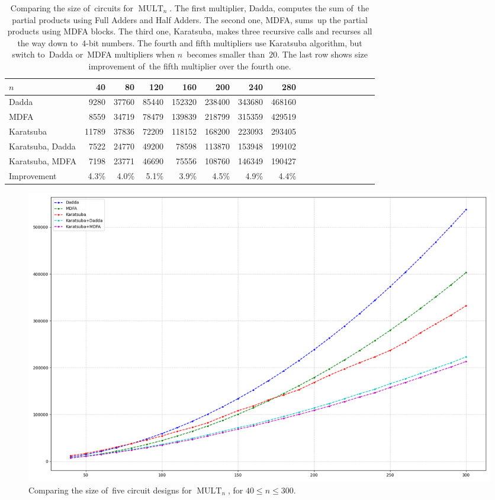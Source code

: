 \documentclass[a4paper, UKenglish, cleveref, autoref,  thm-restate, anonymous]{lipics-v2021}
\DeclareMathOperator{\MULT}{MULT}
\begin{document}
    \begin{table}[ht]
                \caption{Comparing the size of~circuits for $\MULT_n$. The first multiplier, Dadda, computes the sum of~the partial products using Full Adders and Half Adders. The second one, MDFA, sums~up the partial products using MDFA blocks.
            The third one, Karatsuba, makes three recursive calls and recurses all the way down to~4-bit numbers. The fourth and fifth multipliers use Karatsuba algorithm, but switch to~Dadda or~MDFA multipliers when $n$~becomes smaller than~$20$. The last row shows size improvement of~the fifth multiplier over the fourth one.}
        \label{table:multiplication}
        \begin{center}
            \small
            \begin{tabular}{lrrrrrrrrrrrrrrrr}
                \toprule
                $n$ & 40 & 80 & 120 & 160 & 200 & 240 & 280 \\
                \midrule
                Dadda & 9280 & 37760 & 85440 & 152320 & 238400 & 343680 & 468160 \\
                MDFA & 8559 & 34719 & 78479 & 139839 & 218799 & 315359 & 429519 \\
                Karatsuba & 11789 & 37836 & 72209 & 118152 & 168200 & 223093 & 293405 \\
                Karatsuba, Dadda& 7522 & 24770 & 49200 & 78598 & 113870 & 153948 & 199102 \\
                Karatsuba, MDFA& 7198 & 23771 & 46690 & 75556 & 108760 & 146349 & 190427 \\
                Improvement  & 4.3\%  & 4.0\%  & 5.1\%  & 3.9\%  & 4.5\%  & 4.9\%  & 4.4\% \\
                \bottomrule
            \end{tabular}
        \end{center}
    \end{table}

    \begin{figure}[ht]
        \includegraphics[width=\linewidth]{images/plot40_300_10}
        \caption{Comparing the size of~five circuit designs for $\MULT_n$, for $40 \le n \le 300$.}
        \label{figure:multiplication}
    \end{figure}
\end{document}
